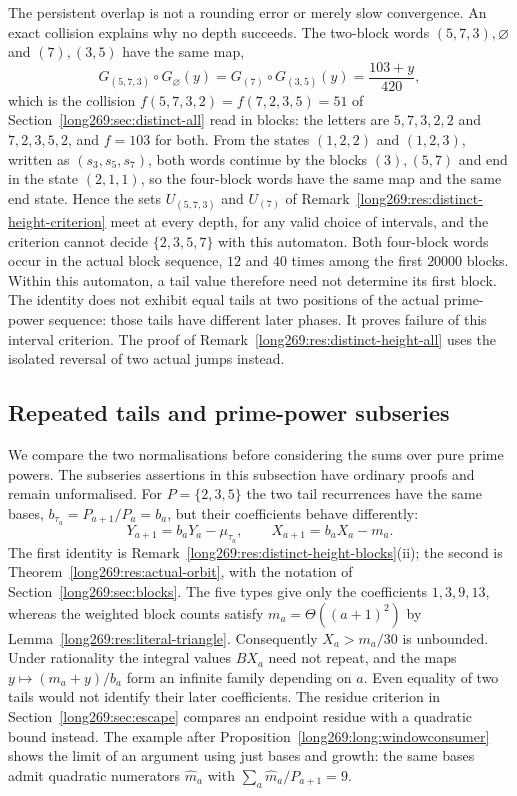 The persistent overlap is not a rounding error or merely slow convergence.
An exact collision explains why no depth succeeds. The two-block words
$(5,7,3),\varnothing$ and $(7),(3,5)$ have the same map,
\[
 G_{(5,7,3)}\circ G_\varnothing(y)=G_{(7)}\circ G_{(3,5)}(y)=\frac{103+y}{420},
\]
which is the collision $f(5,7,3,2)=f(7,2,3,5)=51$ of
Section~\ref{long269:sec:distinct-all} read in blocks: the letters are
$5,7,3,2,2$ and $7,2,3,5,2$, and $f=103$ for both.  From the states
$(1,2,2)$ and $(1,2,3)$, written as $(s_3,s_5,s_7)$, both words continue by
the blocks $(3),(5,7)$ and end in the state $(2,1,1)$, so the four-block
words have the same map and the same end state.  Hence the sets $U_{(5,7,3)}$
and $U_{(7)}$ of Remark~\ref{long269:res:distinct-height-criterion} meet at
every depth, for any valid choice of intervals, and the criterion cannot
decide $\{2,3,5,7\}$ with this automaton.  Both four-block words occur in
the actual block sequence, $12$ and $40$ times among the first $20000$
blocks.  Within this automaton, a tail value therefore need not determine its first block. The identity does not exhibit equal tails at two positions of the actual prime-power sequence: those tails have different later phases. It proves failure of this interval criterion. The proof of Remark~\ref{long269:res:distinct-height-all} uses the isolated reversal of two actual jumps instead.

\subsection{Repeated tails and prime-power subseries}
\label{long269:sec:distinct-stop}

We compare the two normalisations before considering the sums over pure
prime powers. The subseries assertions in this subsection have ordinary
proofs and remain unformalised. For $P=\{2,3,5\}$ the two tail recurrences
have the same bases,
$b_{\tau_a}=P_{a+1}/P_a=b_a$, but their coefficients behave differently:
\[
 Y_{a+1}=b_aY_a-\mu_{\tau_a},\qquad
 X_{a+1}=b_aX_a-m_a.
\]
The first identity is Remark~\ref{long269:res:distinct-height-blocks}(ii);
the second is Theorem~\ref{long269:res:actual-orbit}, with the notation of
Section~\ref{long269:sec:blocks}. The five types give only the coefficients $1,3,9,13$, whereas the
weighted block counts satisfy
$m_a=\Theta((a+1)^2)$ by Lemma~\ref{long269:res:literal-triangle}.
Consequently $X_a>m_a/30$ is unbounded. Under rationality the integral
values $BX_a$ need not repeat, and the maps $y\mapsto(m_a+y)/b_a$ form
an infinite family depending on $a$. Even equality of two tails would
not identify their later coefficients. The residue criterion in
Section~\ref{long269:sec:escape} compares an endpoint residue with a
quadratic bound instead. The example after
Proposition~\ref{long269:long:windowconsumer} shows the limit of an argument
using just bases and growth: the same bases admit quadratic numerators
$\widehat m_a$ with $\sum_a\widehat m_a/P_{a+1}=9$.

